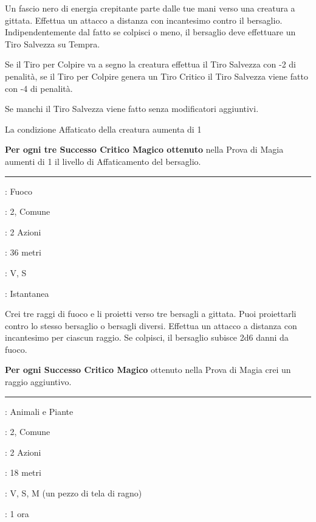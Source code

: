 \begin{multicols}{2}
Un fascio nero di energia crepitante parte dalle tue mani verso una creatura a gittata. Effettua un attacco a distanza con incantesimo contro il bersaglio. Indipendentemente dal fatto se colpisci o meno, il bersaglio deve effettuare un Tiro Salvezza su Tempra.

Se il Tiro per Colpire va a segno la creatura effettua il Tiro Salvezza con -2 di penalità, se il Tiro per Colpire genera un Tiro Critico il Tiro Salvezza viene fatto con -4 di penalità.

Se manchi il Tiro Salvezza viene fatto senza modificatori aggiuntivi.

La condizione Affaticato della creatura aumenta di 1

\textbf{Per ogni tre Successo Critico Magico ottenuto} nella Prova di Magia aumenti di 1 il livello di Affaticamento del bersaglio.

\smallskip\noindent\rule{\linewidth}{2pt} \hypertarget{Raggio Rovente}{}\medskip{}
\noindent
\begin{description}[noitemsep, topsep=0pt, parsep=0pt, partopsep=0pt, leftmargin=0cm, labelwidth=2.8cm]
	\item[\textbf{Lista di Magia}]: Fuoco
	\item[\textbf{Livello}]: 2, Comune
	\item[\textbf{T. di Lancio}]: 2 Azioni
	\item[\textbf{Gittata}]: 36 metri
	\item[\textbf{Componenti}]: V, S
	\item[\textbf{Durata}]: Istantanea
\end{description}

Crei tre raggi di fuoco e li proietti verso tre bersagli a gittata. Puoi proiettarli contro lo stesso bersaglio o bersagli diversi. Effettua un attacco a distanza con incantesimo per ciascun raggio. Se colpisci, il bersaglio subisce 2d6 danni da fuoco.

\textbf{Per ogni Successo Critico Magico} ottenuto nella Prova di Magia crei un raggio aggiuntivo.

\smallskip\noindent\rule{\linewidth}{2pt} \hypertarget{Ragnatela}{}\medskip{}
\noindent
\begin{description}[noitemsep, topsep=0pt, parsep=0pt, partopsep=0pt, leftmargin=0cm, labelwidth=2.8cm]
	\item[\textbf{Lista di Magia}]: Animali e Piante
	\item[\textbf{Livello}]: 2, Comune
	\item[\textbf{T. di Lancio}]: 2 Azioni
	\item[\textbf{Gittata}]: 18 metri
	\item[\textbf{Componenti}]: V, S, M (un pezzo di tela di ragno)
	\item[\textbf{Durata}]: 1 ora
\end{description}


\end{multicols}
